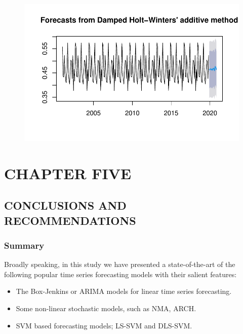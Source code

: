 \documentclass[12pt,a4paper]{book}
\begin{document}
{\begin{figure}[H]
{\centering \includegraphics{Quarto_files/figure-pdf/unnamed-chunk-15-1.pdf}

}

\end{figure}

\hypertarget{chapter-five}{%
\chapter{CHAPTER FIVE}\label{chapter-five}}

\hypertarget{conclusions-and-recommendations}{%
\section{CONCLUSIONS AND
RECOMMENDATIONS}\label{conclusions-and-recommendations}}

\hypertarget{summary}{%
\subsection{Summary}\label{summary}}

Broadly speaking, in this study we have presented a state-of-the-art of
the following popular time series forecasting models with their salient
features:

\begin{itemize}
\tightlist
\item
  The Box-Jenkins or ARIMA models for linear time series forecasting.
\item
  Some non-linear stochastic models, such as NMA, ARCH.
\item
  SVM based forecasting models; LS-SVM and DLS-SVM.
\end{itemize}

\hypertarget{conclusions}{%
}}
\end{document}
